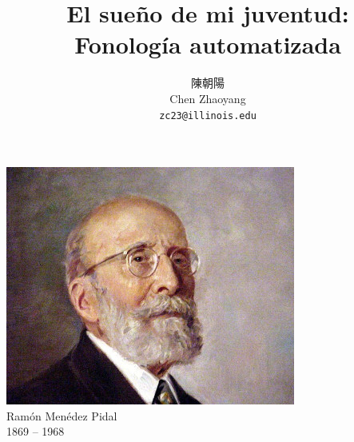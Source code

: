 \documentclass{report}[12pt]
\title{El sueño de mi juventud: \\ Fonología automatizada}
\author{陳朝陽 \\ Chen Zhaoyang \\ \texttt{zc23@illinois.edu}}
\begin{document}
\maketitle

\pagebreak

\hspace{0pt}
\vfill

\begin{center}
  \includegraphics[scale=1.25]{pidal.jpg} \\
  \vspace{0.2cm}
  \Huge{Ramón Menédez Pidal \\ 1869 -- 1968}
\end{center}

\vfill  
\hspace{0pt}

\thispagestyle{empty}

\pagebreak

\hspace{0pt}
\vfill
\end{document}

